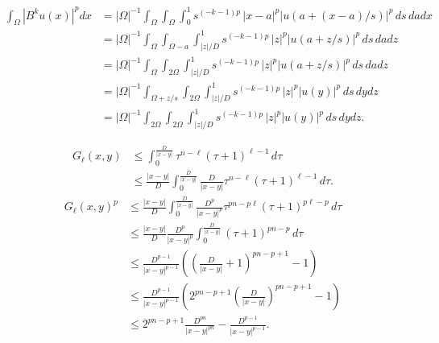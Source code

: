 \documentclass[a4paper]{article}
\begin{document}
\begin{align*}
    \int_{\Omega}
    \left| B^{k} u(x) \right|^{p}
    dx
    &
    = 
    |\Omega|^{-1}
    \int_{\Omega}
    \int_{\Omega} 
    \int_0^1
    s^{(-{k}-1)p}\, |x-a|^{p} \left| u\left( a+(x-a)/s \right) \right|^{p} \,ds\,da
    dx
    \\&
    = 
    |\Omega|^{-1}
    \int_{\Omega}
    \int_{\Omega-a} 
    \int_{|z|/D}^{1}
    s^{(-{k}-1)p}\, |z|^{p} \left| u\left( a+z/s \right) \right|^{p} \,ds\,da
    dz
    \\&
    = 
    |\Omega|^{-1}
    \int_{\Omega}
    \int_{2\Omega} 
    \int_{|z|/D}^{1}
    s^{(-{k}-1)p}\, |z|^{p} \left| u\left( a+z/s \right) \right|^{p} \,ds\,da
    dz
    \\&
    = 
    |\Omega|^{-1}
    \int_{\Omega + z/s}
    \int_{2\Omega} 
    \int_{|z|/D}^{1} %
    s^{(-{k}-1)p}\, |z|^{p} \left| u\left( y \right) \right|^{p} \,ds\,dy
    dz
    \\&
    = 
    |\Omega|^{-1}
    \int_{2\Omega}
    \int_{2\Omega} 
    \int_{|z|/D}^{1} %
    s^{(-{k}-1)p}\, |z|^{p} \left| u\left( y \right) \right|^{p} \,ds\,dy
    dz
    .
\end{align*}



\begin{align*}
    G_\ell(x,y) 
    &\leq 
    \int_{0}^{\frac{D}{|x-y|}} \tau^{n-\ell} (\tau+1)^{\ell-1} \,d\tau
    \\
    &\leq 
    \frac{|x-y|}{D}
    \int_{0}^{\frac{D}{|x-y|}} \frac{D}{|x-y|} \tau^{n-\ell} (\tau+1)^{\ell-1} \,d\tau
    .
\end{align*}
\begin{align*}
    G_\ell(x,y)^{p} 
    &\leq 
    \frac{|x-y|}{D}
    \int_{0}^{\frac{D}{|x-y|}} \frac{D^{p}}{|x-y|^{p}} \tau^{pn-p\ell} (\tau+1)^{p\ell-p} \,d\tau
    \\&\leq 
    \frac{|x-y|}{D}
    \frac{D^{p}}{|x-y|^{p}} \int_{0}^{\frac{D}{|x-y|}} (\tau+1)^{pn-p} \,d\tau
    \\&\leq 
    \frac{D^{p-1}}{|x-y|^{p-1}} \left( \left( \frac{D}{|x-y|} + 1 \right)^{pn-p+1} - 1 \right)
    \\&\leq 
    \frac{D^{p-1}}{|x-y|^{p-1}} \left( 2^{pn-p+1} \left( \frac{D}{|x-y|} \right)^{pn-p+1} - 1 \right)
    \\&\leq 
    2^{pn-p+1} \frac{D^{pn}}{|x-y|^{pn}} - \frac{D^{p-1}}{|x-y|^{p-1}}
    .
\end{align*}
\end{document}
